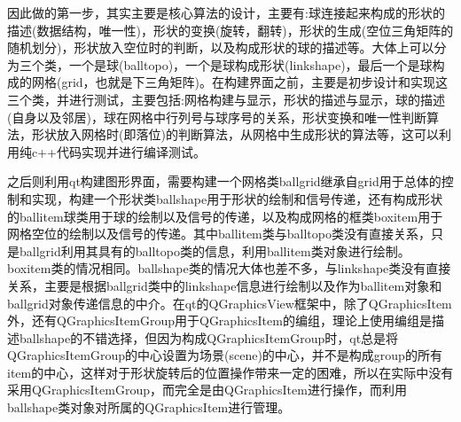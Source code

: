 \documentclass[11pt,twoside]{article} %
\begin{document}
因此做的第一步，其实主要是核心算法的设计，主要有:球连接起来构成的形状的描述(数据结构，唯一性)，形状的变换(旋转，翻转)，形状的生成(空位三角矩阵的随机划分)，形状放入空位时的判断，以及构成形状的球的描述等。大体上可以分为三个类，一个是球(balltopo)，一个是球构成形状(linkshape)，最后一个是球构成的网格(grid，也就是下三角矩阵)。在构建界面之前，主要是初步设计和实现这三个类，并进行测试，主要包括:网格构建与显示，形状的描述与显示，球的描述(自身以及邻居)，球在网格中行列号与球序号的关系，形状变换和唯一性判断算法，形状放入网格时(即落位)的判断算法，从网格中生成形状的算法等，这可以利用纯c++代码实现并进行编译测试。

之后则利用qt构建图形界面，需要构建一个网格类ballgrid继承自grid用于总体的控制和实现，构建一个形状类ballshape用于形状的绘制和信号传递，还有构成形状的ballitem球类用于球的绘制以及信号的传递，以及构成网格的框类boxitem用于网格空位的绘制以及信号的传递。其中ballitem类与balltopo类没有直接关系，只是ballgrid利用其具有的balltopo类的信息，利用ballitem类对象进行绘制。boxitem类的情况相同。ballshape类的情况大体也差不多，与linkshape类没有直接关系，主要是根据ballgrid类中的linkshape信息进行绘制以及作为ballitem对象和ballgrid对象传递信息的中介。在qt的QGraphicsView框架中，除了QGraphicsItem外，还有QGraphicsItemGroup用于QGraphicsItem的编组，理论上使用编组是描述ballshape的不错选择，但因为构成QGraphicsItemGroup时，qt总是将QGraphicsItemGroup的中心设置为场景(scene)的中心，并不是构成group的所有item的中心，这样对于形状旋转后的位置操作带来一定的困难，所以在实际中没有采用QGraphicsItemGroup，而完全是由QGraphicsItem进行操作，而利用ballshape类对象对所属的QGraphicsItem进行管理。
\end{document}
